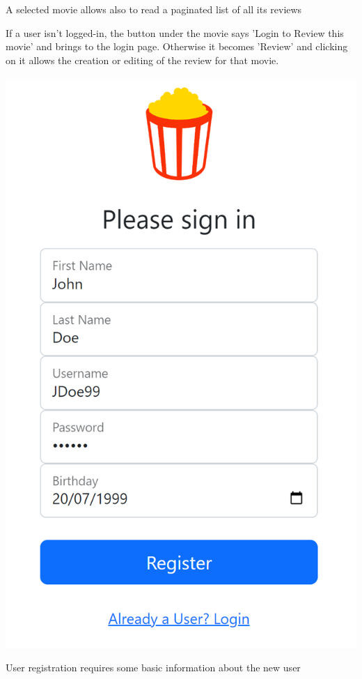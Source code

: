 A selected movie allows also to read a paginated list of all its reviews

If a user isn't logged-in, the button under the movie says 'Login to Review this movie' and brings to the login page. Otherwise it becomes 'Review' and clicking on it allows the creation or editing of the review for that movie.

\includegraphics[scale=0.45]{../../../images/user_manual/user_registration.png} 

User registration requires some basic information about the new user

